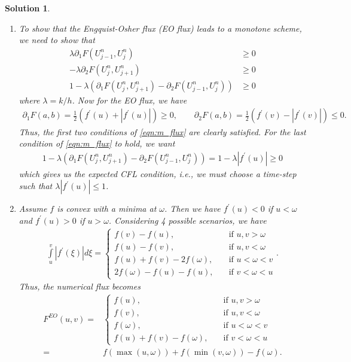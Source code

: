 \documentclass[10pt,letterpaper]{article}
\theoremstyle{break}
\newtheorem{solution}{Solution}
\begin{document}
\begin{solution}
	\begin{enumerate}
		\item
		To show that the Engquist-Osher flux (EO flux) leads to a monotone scheme, we need to show that
		\begin{align} \label{eqn:m_flux}
			\lambda \partial_1F(U^n_{j-1},U^n_j) &\geq 0\\
			-\lambda \partial_2F(U^n_{j},U^n_{j+1}) &\geq 0\\
			1 - \lambda ( \partial_1F(U^n_{j},U^n_{j+1}) - \partial_2F(U^n_{j-1},U^n_j) ) &\geq 0
		\end{align}
		where $\lambda = k/h$. Now for the EO flux, we have
		\begin{gather}
		\partial_1 F(a,b) = \frac{1}{2} \left( f^\prime(u) + |f^\prime(u)| \right) \geq 0, \qquad 
		\partial_2 F(a,b) = \frac{1}{2} \left( f^\prime(v) - |f^\prime(v)| \right) \leq 0.
		\end{gather}
		Thus, the first two conditions of \eqref{eqn:m_flux} are clearly satisfied. For the last condition of \eqref{eqn:m_flux} to hold, we want
		\begin{gather}
		1 - \lambda ( \partial_1F(U^n_{j},U^n_{j+1}) - \partial_2F(U^n_{j-1},U^n_j) ) = 1 - \lambda |f^\prime(u)| \geq 0 
		\end{gather}
		which gives us the expected CFL condition, i.e., we must choose a time-step such that $\lambda |f^\prime(u)| \leq 1$.
		
		\item Assume $f$ is convex with a minima at $\omega$. Then we have $f^\prime(u) < 0$ if $u < \omega$ and $f^\prime(u) > 0$ if $u > \omega$. Considering 4 possible scenarios, we have
		\begin{align}
			\int \limits_u^v |f^\prime(\xi) | d \xi = \begin{cases}
				f(v) - f(u), & \quad \text{if } u,v > \omega\\
				f(u) - f(v), & \quad \text{if } u,v < \omega\\
				f(u) + f(v) - 2f(\omega), & \quad \text{if } u < \omega < v \\
				2 f(\omega) - f(u) - f(u), & \quad \text{if } v < \omega < u
			\end{cases}.
		\end{align}
		Thus, the numerical flux becomes 
		\begin{align}
			F^{EO}(u,v) =& \begin{cases}
			f(u), & \quad \text{if } u,v > \omega\\
			f(v), & \quad \text{if } u,v < \omega\\
			f(\omega), & \quad \text{if } u < \omega < v \\
			f(u) + f(v) - f(\omega), & \quad \text{if } v < \omega < u
			\end{cases}\\
			=& f(\max(u,\omega)) + f(\min(v,\omega)) - f(\omega).
		\end{align}
	\end{enumerate}
\end{solution}
\end{document}
